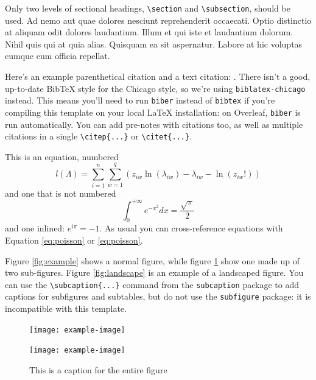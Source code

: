 \documentclass{cup-pan}
\begin{document}
Only two levels of sectional headings, \verb|\section| and \verb|\subsection|, should be used. Ad nemo aut quae dolores nesciunt reprehenderit occaecati. Optio distinctio at aliquam odit dolores laudantium. Illum et qui iste et laudantium dolorum. Nihil quis qui at quia alias. Quisquam ea sit aspernatur. Labore at hic voluptas cumque eum officia repellat.

Here's an example parenthetical citation \citep{asce} and a text citation: \citet{asce}. There isn't a good, up-to-date BibTeX style for the Chicago style, so we're using \texttt{biblatex-chicago} instead. This means you'll need to run \texttt{biber} instead of \texttt{bibtex} if you're compiling this template on your local \LaTeX{} installation: on Overleaf, \texttt{biber} is run automatically. You can add pre-notes with citations \citep[see also][]{asce} too, as well as multiple citations \citep{asce,asce} in a single \verb|\citep{...}| or \verb|\citet{...}|. 

This is an equation, numbered
\begin{equation}
l(\Lambda)=\sum_{i=1}^{n} \sum_{w=1}^{q} (z_{i w} \ln (\lambda_{i w}) - \lambda_{i w} - \ln (z_{i w}!))
\label{eq:poisson}
\end{equation}
and one that is not numbered
\begin{equation*}
\int_0^{+\infty}e^{-x^2}dx=\frac{\sqrt{\pi}}{2}
\end{equation*}
and one inlined: $e^{i\pi}=-1$. As usual you can cross-reference equations with Equation \ref{eq:poisson} or \eqref{eq:poisson}.

Figure \ref{fig:example} shows a normal figure, while figure \ref{fig:twosubs} show one made up of two sub-figures. Figure \ref{fig:landscape} is an example of a landscaped figure. You can use the \verb|\subcaption{...}| command from the \texttt{subcaption} package to add captions for subfigures and subtables, but do not use the \texttt{subfigure} package: it is incompatible with this template.


\begin{figure}
\begin{minipage}{0.47\textwidth}
\texttt{[image: example-image]}
\end{minipage}
\hfill
\begin{minipage}{0.47\textwidth}
\texttt{[image: example-image]}
\end{minipage}

\caption{This is a caption for the entire figure}
\label{fig:twosubs}
\end{figure}
\end{document}
